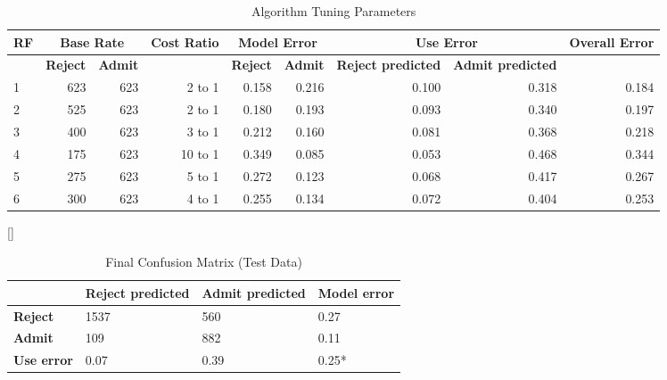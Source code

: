 \documentclass[titlepage]{article}   	%
\begin{document}
\begin{table}
\centering
\caption{Algorithm Tuning Parameters}
\label{my-label}
\begin{tabular}{@{}lrrrrrrrr@{}}
\toprule
\textbf{RF} & \multicolumn{2}{c}{\textbf{Base Rate}} & \multicolumn{1}{l}{\textbf{Cost Ratio}} & \multicolumn{2}{c}{\textbf{Model Error}} & \multicolumn{2}{c}{\textbf{Use Error}} & \multicolumn{1}{l}{\textbf{Overall Error}} \\ \midrule
\textbf{} & \textbf{Reject} & \textbf{Admit} & \textbf{} & \textbf{Reject} & \textbf{Admit} & \textbf{Reject predicted} & \textbf{Admit predicted} & \textbf{} \\
1 & 623 & 623 & 2 to 1 & 0.158 & 0.216 & 0.100 & 0.318 & 0.184 \\
2 & 525 & 623 & 2 to 1 & 0.180 & 0.193 & 0.093 & 0.340 & 0.197 \\
3 & 400 & 623 & 3 to 1 & 0.212 & 0.160 & 0.081 & 0.368 & 0.218 \\
4 & 175 & 623 & 10 to 1 & 0.349 & 0.085 & 0.053 & 0.468 & 0.344 \\
5 & 275 & 623 & 5 to 1 & 0.272 & 0.123 & 0.068 & 0.417 & 0.267 \\
6 & 300 & 623 & 4 to 1 & 0.255 & 0.134 & 0.072 & 0.404 & 0.253 \\ \bottomrule
\end{tabular}
\end{table}[]

\begin{table}[]
\centering
\caption{Final Confusion Matrix (Test Data)}
\label{my-label}
\begin{tabular}{@{}llll@{}}
\toprule
 & \textbf{Reject predicted} & \textbf{Admit predicted} & \textbf{Model error} \\ \midrule
\textbf{Reject} & 1537 & 560 & 0.27 \\
\textbf{Admit} & 109 & 882 & 0.11 \\
\textbf{Use error} & 0.07 & 0.39 & 0.25* \\ \bottomrule
\end{tabular}
\end{table}
\end{document}
